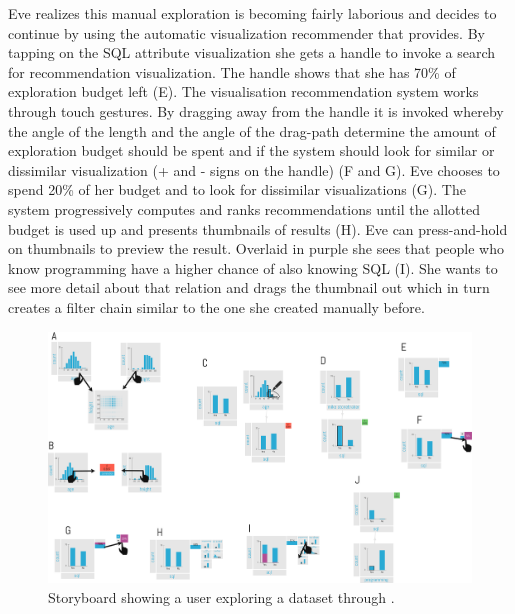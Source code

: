 Eve realizes this manual exploration is becoming fairly laborious and decides to continue by using the automatic visualization recommender that \system{} provides. By tapping on the SQL attribute visualization she gets a handle to invoke a search for recommendation visualization. The handle shows that she has 70\% of exploration budget left (E). The visualisation recommendation system works through touch gestures. By dragging away from the handle it is invoked whereby the angle of the length and the angle of the drag-path determine the amount of exploration budget should be spent and if the system should look for similar or dissimilar visualization (+ and - signs on the handle) (F and G). Eve chooses to spend 20\% of her budget and to look for dissimilar visualizations (G). The system progressively computes and ranks recommendations until the allotted budget is used up and presents thumbnails of results (H). Eve can press-and-hold on thumbnails to preview the result. Overlaid in purple she sees that people who know programming have a higher chance of also knowing SQL (I). She wants to see more detail about that relation and drags the thumbnail out which in turn creates a filter chain similar to the one she created manually before. 


\begin{figure}[t]
\center
\includegraphics[width=\textwidth]{figures/storyboard.pdf}
\caption{Storyboard showing a user exploring a dataset through \system{}.}
\label{fig:sb}
\end{figure}
